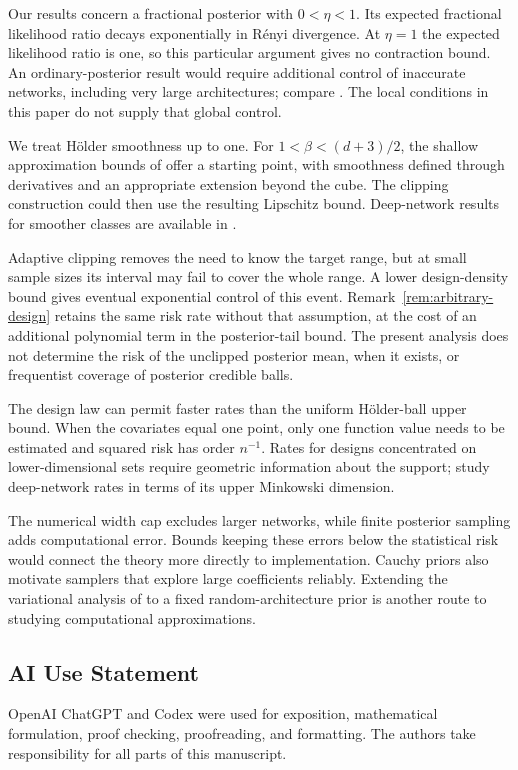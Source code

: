 \documentclass[11pt,a4paper]{article}
\theoremstyle{remark}
\begin{document}
Our results concern a fractional posterior with $0<\eta<1$.
Its expected fractional likelihood ratio decays exponentially in R\'enyi
divergence. At $\eta=1$ the expected likelihood ratio is one, so
this particular argument gives no contraction bound. An
ordinary-posterior result would require additional control of
inaccurate networks, including very large architectures; compare
\citet{kongkim2025}. The local conditions in this paper do not
supply that global control.

We treat H\"older smoothness up to one. For
$1<\beta<(d+3)/2$, the shallow approximation bounds of
\citet{yangzhou2025} offer a starting point, with smoothness defined
through derivatives and an appropriate extension beyond the cube.
The clipping construction could then use the resulting Lipschitz
bound. Deep-network results for smoother classes are available in
\citet{kongkim2025}.

Adaptive clipping removes the need to know the target range, but
at small sample sizes its interval may fail to cover the whole
range. A lower design-density bound gives eventual exponential
control of this event. Remark~\ref{rem:arbitrary-design} retains
the same risk rate without that assumption, at the cost of an
additional polynomial term in the posterior-tail bound. The present
analysis does not determine the risk of the unclipped posterior
mean, when it exists, or frequentist coverage of posterior credible balls.

The design law can permit faster rates than the uniform
H\"older-ball upper bound. When the covariates equal one point,
only one function value needs to be estimated and squared risk has
order $n^{-1}$. Rates for designs concentrated on lower-dimensional
sets require geometric information about the support;
\citet[Section~3.3]{castilloegels2025} study deep-network rates in
terms of its upper Minkowski dimension.

The numerical width cap excludes larger networks, while finite
posterior sampling adds computational error. Bounds keeping these
errors below the statistical risk would connect the theory more
directly to implementation. Cauchy priors also motivate samplers that
explore large coefficients reliably. Extending the variational
analysis of \citet{castilloegels2025} to a fixed random-architecture
prior is another route to studying computational approximations.

\subsection*{AI Use Statement}
OpenAI ChatGPT and Codex were used for exposition, mathematical
formulation, proof checking, proofreading, and formatting.
The authors take responsibility for all parts of this manuscript.
\end{document}
